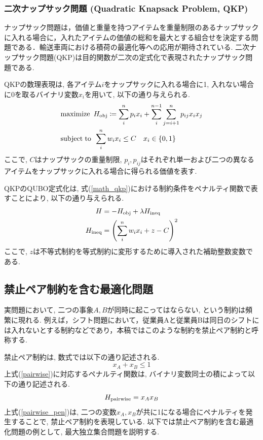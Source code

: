 \documentclass[submit,techrep,noauthor]{ipsj}
\begin{document}
\subsubsection{二次ナップサック問題 (Quadratic Knapsack Problem, QKP)}
ナップサック問題は，価値と重量を持つアイテムを重量制限のあるナップサックに入れる場合に，入れたアイテムの価値の総和を最大とする組合せを決定する問題である．輸送車両における積荷の最適化等への応用が期待されている. 二次ナップサック問題(QKP)は目的関数が二次の定式化で表現されたナップサック問題である. 

QKPの数理表現は, 各アイテム$i$をナップサックに入れる場合に1, 入れない場合に0を取るバイナリ変数$x_{i}$を用いて, 以下の通り与えられる.
\begin{align}
&{\rm{maximize}\hspace{5pt}} H_{\rm{obj}}\coloneq\sum_{i}^{n}p_{i}x_{i}+\sum_{i}^{n-1}\sum_{j=i+1}^{n}p_{ij}x_{i}x_{j}\nonumber\\
&{\rm{subject}\hspace{3pt}\rm{to}\hspace{5pt}} \sum_{i}^{n}w_{i}x_{i}\le C \hspace{10pt} x_{i}\in \{0, 1\} \label{math_qkp}
\end{align}
ここで, $C$はナップサックの重量制限, $p_{i}, p_{ij}$はそれぞれ単一および二つの異なるアイテムをナップサックに入れる場合に得られる価値を表す. 

QKPのQUBO定式化は, 式(\ref{math_qkp})における制約条件をペナルティ関数で表すことにより, 以下の通り与えられる.
\begin{align}
H &= -H_{\rm{obj}} + \lambda H_{\rm{ineq}}\nonumber\\
H_{\rm{ineq}} &= \left(\sum_{i}^{n}w_{i}x_{i}+z-C\right)^{2} \label{ham_qkp}
\end{align}
ここで, $z$は不等式制約を等式制約に変形するために導入された補助整数変数である.

\subsection{禁止ペア制約を含む最適化問題}
実問題において, 二つの事象$A, B$が同時に起こってはならない, という制約は頻繁に現れる. 例えば，シフト問題において，従業員Aと従業員Bは同日のシフトには入れないとする制約などであり，本稿ではこのような制約を禁止ペア制約と呼称する. 

禁止ペア制約は, 数式では以下の通り記述される.
\begin{equation}
x_{A}+x_{B} \le 1 \label{pairwise}
\end{equation}
上式(\ref{pairwise})に対応するペナルティ関数は, バイナリ変数同士の積によって以下の通り記述される.
\begin{equation}
H_{{\rm pairwise}}=x_{A}x_{B} \label{pairwise_pen}
\end{equation}
上式(\ref{pairwise_pen})は, 二つの変数$x_{A}, x_{B}$が共に1になる場合にペナルティを発生することで, 禁止ペア制約を表現している. 以下では禁止ペア制約を含む最適化問題の例として, 最大独立集合問題を説明する.
\end{document}
